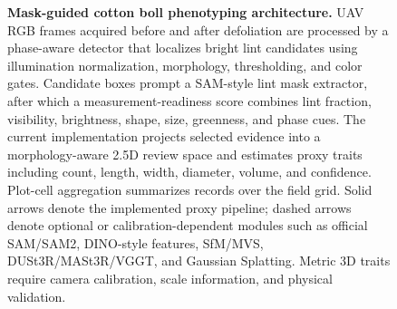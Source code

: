 % 

\begin{figure}[t]
  \centering
  \resizebox{\textwidth}{!}{%
    
  }
  \caption{\textbf{Mask-guided cotton boll phenotyping architecture.}
  UAV RGB frames acquired before and after defoliation are processed by a
  phase-aware detector that localizes bright lint candidates using illumination
  normalization, morphology, thresholding, and color gates. Candidate boxes
  prompt a SAM-style lint mask extractor, after which a measurement-readiness
  score combines lint fraction, visibility, brightness, shape, size, greenness,
  and phase cues. The current implementation projects selected evidence into a
  morphology-aware 2.5D review space and estimates proxy traits including count,
  length, width, diameter, volume, and confidence. Plot-cell aggregation
  summarizes records over the field grid. Solid arrows denote the implemented
  proxy pipeline; dashed arrows denote optional or calibration-dependent modules
  such as official SAM/SAM2, DINO-style features, SfM/MVS, DUSt3R/MASt3R/VGGT,
  and Gaussian Splatting. Metric 3D traits require camera calibration, scale
  information, and physical validation.}
  \label{fig:mask-guided-cotton-architecture}
\end{figure}
